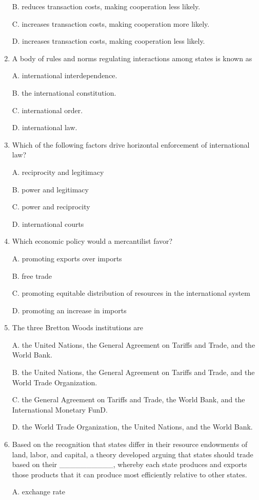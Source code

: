 \documentclass[
]{book}
\begin{document}
\begin{enumerate}
  B. reduces transaction costs, making cooperation less likely.

  C. increases transaction costs, making cooperation more likely.

  D. increases transaction costs, making cooperation less likely.
\item
  A body of rules and norms regulating interactions among states is known as

  A. international interdependence.

  B. the international constitution.

  C. international order.

  D. international law.
\item
  Which of the following factors drive horizontal enforcement of international law?

  A. reciprocity and legitimacy

  B. power and legitimacy

  C. power and reciprocity

  D. international courts
\item
  Which economic policy would a mercantilist favor?

  A. promoting exports over imports

  B. free trade

  C. promoting equitable distribution of resources in the international system

  D. promoting an increase in imports
\item
  The three Bretton Woods institutions are

  A. the United Nations, the General Agreement on Tariffs and Trade, and the World Bank.

  B. the United Nations, the General Agreement on Tariffs and Trade, and the World Trade Organization.

  C. the General Agreement on Tariffs and Trade, the World Bank, and the International Monetary FunD.

  D. the World Trade Organization, the United Nations, and the World Bank.
\item
  Based on the recognition that states differ in their resource endowments of land, labor, and capital, a theory developed arguing that states should trade based on their \_\_\_\_\_\_\_\_\_\_, whereby each state produces and exports those products that it can produce most efficiently relative to other states.

  A. exchange rate


\end{enumerate}
\end{document}
